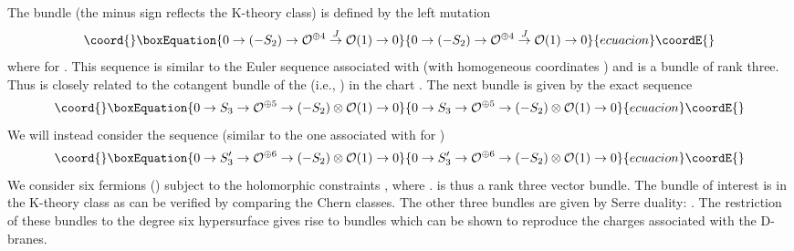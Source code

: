 \documentclass[a4paper,12pt]{article}
\begin{document}
The bundle \coordHE{} (the minus sign reflects the K-theory class)
is defined by the left mutation
\begin{equation}\coord{}\boxEquation{
0\rightarrow (-S_2) \rightarrow  {\cal O}^{\oplus 4}
\stackrel{J}{\rightarrow} {\cal O}(1) \rightarrow 0
}{
0\rightarrow (-S_2) \rightarrow  {\cal O}^{\oplus 4}
\stackrel{J}{\rightarrow} {\cal O}(1) \rightarrow 0
}{ecuacion}\coordE{}\end{equation}
where \coordHE{} for \coordHE{}. This sequence is similar to the
Euler sequence associated with \coordHE{} (with homogeneous coordinates
\coordHE{}) and is a bundle of rank three. Thus \coordHE{}
is closely related to the cotangent bundle of the \coordHE{} (i.e.,
\coordHE{}) in the chart \coordHE{}.
The next bundle is given by the exact sequence
\begin{equation}\coord{}\boxEquation{
0\rightarrow S_3
\rightarrow {\cal O}^{\oplus 5}\rightarrow
(-S_2)\otimes{\cal O}(1)\rightarrow 0
}{
0\rightarrow S_3
\rightarrow {\cal O}^{\oplus 5}\rightarrow
(-S_2)\otimes{\cal O}(1)\rightarrow 0
}{ecuacion}\coordE{}\end{equation}
We will instead consider the sequence (similar to the one associated
with \coordHE{} for \coordHE{})
\begin{equation}\coord{}\boxEquation{
0\rightarrow S'_3 \rightarrow {\cal O}^{\oplus 6} \rightarrow 
(-S_2)\otimes{\cal O}(1)\rightarrow 0
}{
0\rightarrow S'_3 \rightarrow {\cal O}^{\oplus 6} \rightarrow 
(-S_2)\otimes{\cal O}(1)\rightarrow 0
}{ecuacion}\coordE{}\end{equation}
We consider six fermions \myHighlight{$\pi^{[ij]}$}\coordHE{} (\coordHE{}) subject to
the holomorphic constraints \coordHE{}, 
where \coordHE{}.
\coordHE{} is thus a rank three vector bundle.
The bundle of interest \coordHE{} is in the K-theory class \coordHE{}
as can be verified by comparing the Chern classes\cite{helices}.
The other three bundles are given by Serre duality:
\coordHE{}.  The  restriction of
these bundles to the degree six hypersurface gives rise to bundles
\coordHE{} which can be shown to reproduce the charges associated with
the \coordHE{} D-branes\cite{helices}.
\end{document}
